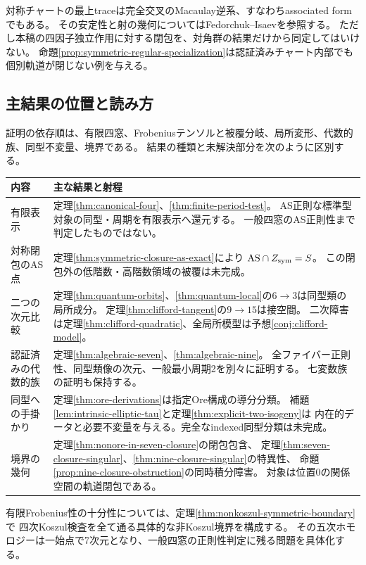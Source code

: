 \documentclass[11pt,a4paper]{ltjsarticle}
\theoremstyle{definition}
\begin{document}
対称チャートの最上traceは完全交叉のMacaulay逆系、すなわちassociated formでもある。
その安定性と射の幾何についてはFedorchuk--Isaev\cite{FIstability,FIassociated}を参照する。
ただし本稿の四因子独立作用に対する閉包を、対角群の結果だけから同定してはいけない。
命題\ref{prop:symmetric-regular-specialization}は認証済みチャート内部でも個別軌道が閉じない例を与える。

\subsection*{主結果の位置と読み方}
証明の依存順は、有限四窓、Frobeniusテンソルと被覆分岐、局所変形、代数的族、同型不変量、境界である。
結果の種類と未解決部分を次のように区別する。
\begin{longtable}{p{.24\linewidth}p{.69\linewidth}}
\toprule
内容 & 主な結果と射程\\
\midrule
\endhead
有限表示 &
定理\ref{thm:canonical-four}、\ref{thm:finite-period-test}。
AS正則な標準型対象の同型・周期を有限表示へ還元する。
一般四窓のAS正則性まで判定したものではない。\\
対称閉包のAS点 &
定理\ref{thm:symmetric-closure-as-exact}により
$\mathrm{AS}\cap Z_{\rm sym}=S$。
この閉包外の低階数・高階数領域の被覆は未完成。\\
二つの次元比較 &
定理\ref{thm:quantum-orbits}、\ref{thm:quantum-local}の$6\to3$は同型類の局所成分。
定理\ref{thm:clifford-tangent}の$9\to15$は接空間。
二次障害は定理\ref{thm:clifford-quadratic}、全局所模型は予想\ref{conj:clifford-model}。\\
認証済みの代数的族 &
定理\ref{thm:algebraic-seven}、\ref{thm:algebraic-nine}。
全ファイバー正則性、同型類像の次元、一般最小周期2を別々に証明する。
七変数族の証明も保持する。\\
同型への手掛かり &
定理\ref{thm:ore-derivations}は指定Ore構成の導分分類。
補題\ref{lem:intrinsic-elliptic-tau}と定理\ref{thm:explicit-two-isogeny}は
内在的データと必要不変量を与える。完全なindexed同型分類は未完成。\\
境界の幾何 &
定理\ref{thm:nonore-in-seven-closure}の閉包包含、
定理\ref{thm:seven-closure-singular}、\ref{thm:nine-closure-singular}の特異性、
命題\ref{prop:nine-closure-obstruction}の同時積分障害。
対象は位置0の関係空間の軌道閉包である。\\
\bottomrule
\end{longtable}

有限Frobenius性の十分性については、定理\ref{thm:nonkoszul-symmetric-boundary}で
四次Koszul検査を全て通る具体的な非Koszul境界を構成する。
その五次ホモロジーは一始点で7次元となり、一般四窓の正則性判定に残る問題を具体化する。
\end{document}
